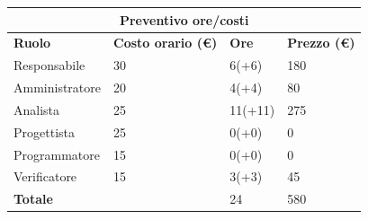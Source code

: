 \documentclass[a4paper, 12pt]{article}
\begin{document}
\begin{center}
	\begin{tabularx}{\textwidth}{|X|X|X|X|}
		\hline
		\multicolumn{4}{|c|}{\textbf{Preventivo ore/costi}}                                      \\
		\hline
		\hline
		\textbf{Ruolo}  & \textbf{Costo orario (\euro)} & \textbf{Ore} & \textbf{Prezzo (\euro)} \\
		\hline
		Responsabile    & 30                            & 6(+6)        & 180                     \\
		\hline
		Amministratore  & 20                            & 4(+4)        & 80                      \\
		\hline
		Analista        & 25                            & 11(+11)      & 275                     \\
		\hline
		Progettista     & 25                            & 0(+0)        & 0                       \\
		\hline
		Programmatore   & 15                            & 0(+0)        & 0                       \\
		\hline
		Verificatore    & 15                            & 3(+3)        & 45                      \\
		\hline
		\hline
		\textbf{Totale} &                               & 24           & 580                     \\
		\hline
	\end{tabularx}\\[8pt]
	\mbox{}\\
\end{center}
\end{document}
